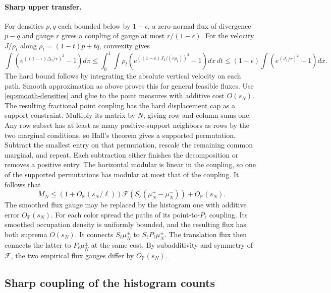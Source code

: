 \documentclass[11pt]{article}
\newcommand{\1}{\mathbf{1}}
\numberwithin{equation}{section}
\begin{document}
\paragraph{Sharp upper transfer.}
For densities \(p,q\) each bounded below by \(1-\epsilon\),
a zero-normal flux of divergence \(p-q\) and gauge \(r\)
gives a coupling of gauge at most \(r/(1-\epsilon)\).
For the velocity \(J/\rho_t\) along
\(\rho_t=(1-t)p+tq\), convexity gives
\[
 \int \!\left(e^{((1-\epsilon)\Delta_1/r)^2}-1\right)d\pi
 \le \int_0^1\!\int \rho_t
       \left(e^{((1-\epsilon)J_1/(r\rho_t))^2}-1\right) dx\,dt
 \le (1-\epsilon)\int\!\left(e^{(J_1/r)^2}-1\right) dx .
\]
The hard bound follows by integrating the absolute vertical
velocity on each path. Smooth approximation as above proves
this for general feasible fluxes. Use \eqref{eq:smooth-densities}
and glue to the point measures with additive cost \(O(s_N)\).
The resulting fractional point coupling has the hard
displacement cap as a support constraint. Multiply its matrix by
\(N\), giving row and column sums one. Any row subset has at least
as many positive-support neighbors as rows by the two marginal
conditions, so Hall's theorem gives a supported permutation.
Subtract the smallest entry on that permutation, rescale the
remaining common marginal, and repeat. Each subtraction either
finishes the decomposition or removes a positive entry. The
horizontal modular is linear in the coupling, so one of the
supported permutations has modular at most that of the coupling.
It follows that
\[
 M_N\le (1+O_{\mathbb P}(s_N/\ell))
   \mathcal F(S_\ell(\mu_N^+-\mu_N^-))+O_{\mathbb P}(s_N).
\]
The smoothed flux gauge may be replaced by the histogram one
with additive error \(O_{\mathbb P}(s_N)\). For each color
spread the paths of its point-to-\(P_\ell\) coupling.
Its smoothed occupation density is uniformly bounded, and
the resulting flux has both suprema \(O(s_N)\). It connects
\(S_\ell\mu_N^\pm\) to \(S_\ell P_\ell\mu_N^\pm\).
The translation flux then connects the latter to
\(P_\ell\mu_N^\pm\) at the same cost.
By subadditivity and symmetry of \(\mathcal F\), the two
empirical flux gauges differ by \(O_{\mathbb P}(s_N)\).
\subsection{Sharp coupling of the histogram counts}
\end{document}
